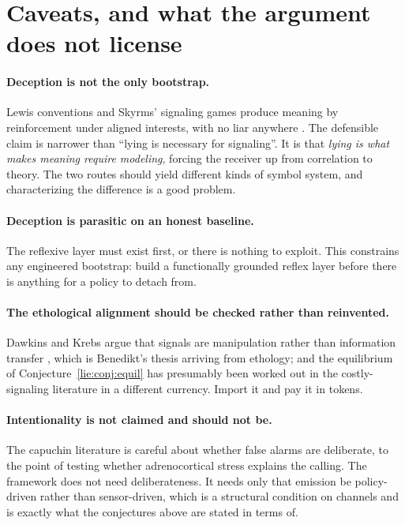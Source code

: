 \section{Caveats, and what the argument does not license}
\label{sec:lie-caveats}

\paragraph{Deception is not the only bootstrap.} Lewis conventions and Skyrms'
signaling games produce meaning by reinforcement under aligned interests, with no
liar anywhere \cite{lewis1969,skyrms2010}. The defensible claim is narrower than
``lying is necessary for signaling''. It is that \emph{lying is what makes
meaning require modeling}, forcing the receiver up from correlation to theory.
The two routes should yield different kinds of symbol system, and characterizing
the difference is a good problem.

\paragraph{Deception is parasitic on an honest baseline.} The reflexive layer
must exist first, or there is nothing to exploit. This constrains any engineered
bootstrap: build a functionally grounded reflex layer before there is anything
for a policy to detach from.

\paragraph{The ethological alignment should be checked rather than reinvented.}
Dawkins and Krebs argue that signals are manipulation rather than information
transfer \cite{dawkinskrebs1978}, which is Benedikt's thesis arriving from
ethology; and the equilibrium of Conjecture~\ref{lie:conj:equil} has presumably
been worked out in the costly-signaling literature \cite{msharper2003} in a
different currency. Import it and pay it in tokens.

\paragraph{Intentionality is not claimed and should not be.} The capuchin
literature is careful about whether false alarms are deliberate, to the point of
testing whether adrenocortical stress explains the calling. The framework does
not need deliberateness. It needs only that emission be policy-driven rather than
sensor-driven, which is a structural condition on channels and is exactly what
the conjectures above are stated in terms of.

